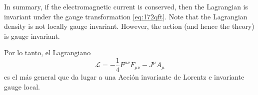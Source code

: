 In summary, if the electromagnetic current is conserved, then the Lagrangian is invariant under the gauge transformation \eqref{eq:172qft}. Note that the Lagrangian density is not locally gauge invariant. However, the action (and hence the theory) is gauge invariant.

\begin{frame}
Por lo tanto, el Lagrangiano
\begin{equation}
  \label{eq:lagAmum}
  \mathcal{L}=-\frac{1}{4}F^{\mu\nu}F_{\mu\nu}-J^\mu A_\mu
\end{equation}
es el más general que da lugar a una Acción invariante de Lorentz e invariante gauge
local. 

\end{frame}

\begin{frame}



\end{frame}
